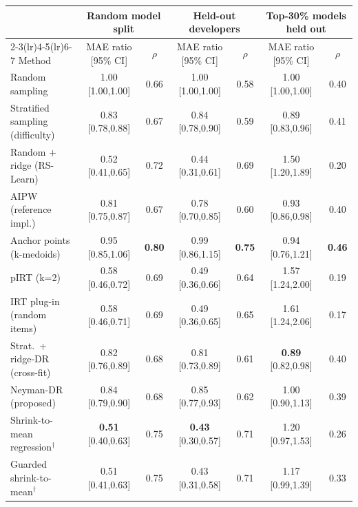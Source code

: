 \begin{tabular}{l cc cc cc}
\toprule
 & \multicolumn{2}{c}{Random model split} & \multicolumn{2}{c}{Held-out developers} & \multicolumn{2}{c}{Top-30\% models held out}\\
\cmidrule(lr){2-3}\cmidrule(lr){4-5}\cmidrule(lr){6-7}
Method & MAE ratio [95\% CI] & $\rho$ & MAE ratio [95\% CI] & $\rho$ & MAE ratio [95\% CI] & $\rho$ \\
\midrule
Random sampling & 1.00 {\scriptsize[1.00,1.00]} & 0.66 & 1.00 {\scriptsize[1.00,1.00]} & 0.58 & 1.00 {\scriptsize[1.00,1.00]} & 0.40 \\
Stratified sampling (difficulty) & 0.83 {\scriptsize[0.78,0.88]} & 0.67 & 0.84 {\scriptsize[0.78,0.90]} & 0.59 & 0.89 {\scriptsize[0.83,0.96]} & 0.41 \\
Random + ridge (RS-Learn) & 0.52 {\scriptsize[0.41,0.65]} & 0.72 & 0.44 {\scriptsize[0.31,0.61]} & 0.69 & 1.50 {\scriptsize[1.20,1.89]} & 0.20 \\
AIPW (reference impl.) & 0.81 {\scriptsize[0.75,0.87]} & 0.67 & 0.78 {\scriptsize[0.70,0.85]} & 0.60 & 0.93 {\scriptsize[0.86,0.98]} & 0.40 \\
Anchor points (k-medoids) & 0.95 {\scriptsize[0.85,1.06]} & \textbf{0.80} & 0.99 {\scriptsize[0.86,1.15]} & \textbf{0.75} & 0.94 {\scriptsize[0.76,1.21]} & \textbf{0.46} \\
pIRT (k=2) & 0.58 {\scriptsize[0.46,0.72]} & 0.69 & 0.49 {\scriptsize[0.36,0.66]} & 0.64 & 1.57 {\scriptsize[1.24,2.00]} & 0.19 \\
IRT plug-in (random items) & 0.58 {\scriptsize[0.46,0.71]} & 0.69 & 0.49 {\scriptsize[0.36,0.65]} & 0.65 & 1.61 {\scriptsize[1.24,2.06]} & 0.17 \\
Strat.\ + ridge-DR (cross-fit) & 0.82 {\scriptsize[0.76,0.89]} & 0.68 & 0.81 {\scriptsize[0.73,0.89]} & 0.61 & \textbf{0.89} {\scriptsize[0.82,0.98]} & 0.40 \\
Neyman-DR (proposed) & 0.84 {\scriptsize[0.79,0.90]} & 0.68 & 0.85 {\scriptsize[0.77,0.93]} & 0.62 & 1.00 {\scriptsize[0.90,1.13]} & 0.39 \\
Shrink-to-mean regression$^\dagger$ & \textbf{0.51} {\scriptsize[0.40,0.63]} & 0.75 & \textbf{0.43} {\scriptsize[0.30,0.57]} & 0.71 & 1.20 {\scriptsize[0.97,1.53]} & 0.26 \\
Guarded shrink-to-mean$^\dagger$ & 0.51 {\scriptsize[0.41,0.63]} & 0.75 & 0.43 {\scriptsize[0.31,0.58]} & 0.71 & 1.17 {\scriptsize[0.99,1.39]} & 0.33 \\
\bottomrule
\end{tabular}
